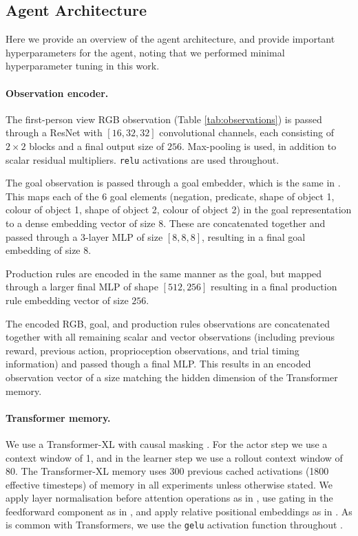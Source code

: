 \subsection{Agent Architecture}
\label{app:agent-architecture}
Here we provide an overview of the agent architecture, and provide important hyperparameters for the agent, noting that we performed minimal hyperparameter tuning in this work.

\paragraph{Observation encoder.}
The first-person view RGB observation (Table \ref{tab:observations}) is passed through a ResNet \citep{he2016resnet} with $[16, 32, 32]$ convolutional channels, each consisting of $2\times2$ blocks and a final output size of $256$. Max-pooling is used, in addition to scalar residual multipliers. \texttt{relu} activations are used throughout.

The goal observation is passed through a goal embedder, which is the same in \citet{xland}. This maps each of the 6 goal elements (negation, predicate, shape of object 1, colour of object 1, shape of object 2, colour of object 2) in the goal representation to a dense embedding vector of size 8. These are concatenated together and passed through a 3-layer MLP of size $[8, 8, 8]$, resulting in a final goal embedding of size $8$.  

Production rules are encoded in the same manner as the goal, but mapped through a larger final MLP of shape $[512, 256]$ resulting in a final production rule embedding vector of size $256$.

The encoded RGB, goal, and production rules observations are concatenated together with all remaining scalar and vector observations (including previous reward, previous action, proprioception observations, and trial timing information) and passed though a final MLP. This results in an encoded observation vector of a size matching the hidden dimension of the Transformer memory. 

\paragraph{Transformer memory.} We use a Transformer-XL with causal masking \citep{dai2019transformer}. For the actor step we use a context window of 1, and in the learner step we use a rollout context window of 80. The Transformer-XL memory uses 300 previous cached activations (1800 effective timesteps) of memory in all experiments unless otherwise stated. We apply layer normalisation before attention operations as in \citet{parisotto2020stabilizing}, use gating in the feedforward component as in \citet{shazeer2020glu}, and apply relative positional embeddings as in \citet{dai2019transformer}. As is common with Transformers, we use the \texttt{gelu} activation function throughout \citep{hendrycks2016GaussianEL}.

